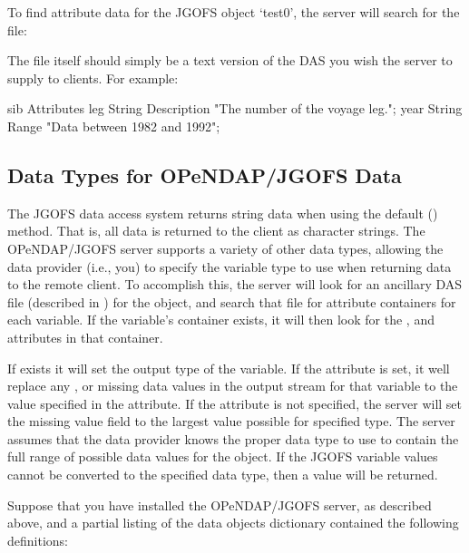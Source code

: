 \documentclass{dods-book}
\begin{document}
To find attribute data for the JGOFS object `test0', the server will
search for the file: 


The file itself should simply be a text version of the DAS you wish
the server to supply to clients.  For example:

\begin{vcode}{sib}
Attributes {
    leg {
       String Description "The number of the voyage leg.";
    }
    year {
       String Range "Data between 1982 and 1992";
    }
}  
\end{vcode}

\subsection{Data Types for OPeNDAP/JGOFS Data}

The JGOFS data access system returns string data when using the
default () method. That is, all data is returned to the
client as character strings. The OPeNDAP/JGOFS server supports a
variety of other data  types, allowing the data provider (i.e., you) to
specify the variable type to use when returning data to the remote
client. To accomplish this, the server will look for an ancillary DAS
file (described in
) for the object, and search that file for
attribute containers for each variable.  If the variable's container
exists, it will then look for the , and
 attributes in that container.

If  exists it will set the output type of the variable.
If the  attribute is set, it well replace any
, or missing data values in the output stream for that
variable to the value specified in the  attribute.
If the  attribute is not specified, the server will
set the missing value field to the largest value possible for
specified type. The server assumes that the data provider knows the
proper data type to use to contain the full range of possible data
values for the object.  If the JGOFS variable values cannot be
converted to the specified data type, then a  value
will be returned.

Suppose that you have installed the OPeNDAP/JGOFS server, as described
above, and a partial listing of the data objects dictionary contained
the following definitions:
\end{document}

